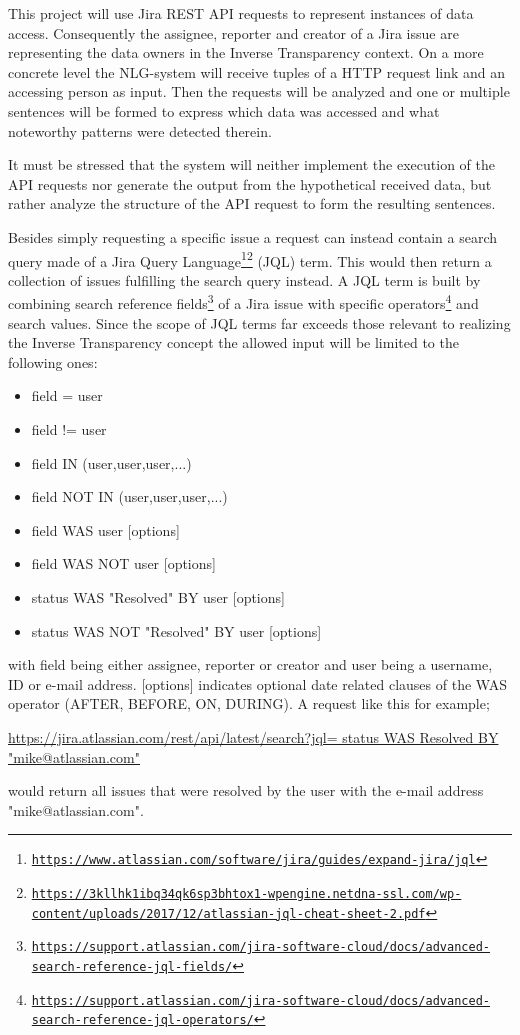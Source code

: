\documentclass[sigconf,obeyspaces]{acmart}
\begin{document}
This project will use Jira REST API requests to represent instances of data access. Consequently the assignee, reporter and creator of a Jira issue are representing the data owners in the Inverse Transparency context. On a more concrete level the NLG-system will receive tuples of a HTTP request link and an accessing person as input. Then the requests will be analyzed and one or multiple sentences will be formed to express which data was accessed and what noteworthy patterns were detected therein.

It must be stressed that the system will neither implement the execution of the API requests nor generate the output from the hypothetical received data, but rather analyze the structure of the API request to form the resulting sentences.

Besides simply requesting a specific issue a request can instead contain a search query made of a Jira Query Language\footnote{\texttt{\url{https://www.atlassian.com/software/jira/guides/expand-jira/jql}}}\footnote{\texttt{\url{https://3kllhk1ibq34qk6sp3bhtox1-wpengine.netdna-ssl.com/wp-content/uploads/2017/12/atlassian-jql-cheat-sheet-2.pdf}}} (JQL) term. This would then return a collection of issues fulfilling the search query instead. A JQL term is built by combining search reference fields\footnote{\texttt{\url{https://support.atlassian.com/jira-software-cloud/docs/advanced-search-reference-jql-fields/}}} of a Jira issue with specific operators\footnote{\texttt{\url{https://support.atlassian.com/jira-software-cloud/docs/advanced-search-reference-jql-operators/}}} and search values. Since the scope of JQL terms far exceeds those relevant to realizing the Inverse Transparency concept the allowed input will be limited to the following ones:
\begin{itemize}\obeyspaces
    \item field = user
    \item field != user
    \item field IN (user,user,user,...)
    \item field NOT IN (user,user,user,...)
    \item field WAS user                                        [options]
    \item field WAS NOT user                               [options]
    \item status WAS "Resolved" BY user              [options]
    \item status WAS NOT "Resolved" BY user     [options]
\end{itemize}
with field being either assignee, reporter or creator and user being a username, ID or e-mail address. [options] indicates optional date related clauses of the WAS operator (AFTER, BEFORE, ON, DURING). A request like this for example;
\begin{center}
    \url{https://jira.atlassian.com/rest/api/latest/search?jql= status WAS Resolved BY "mike@atlassian.com"}
\end{center}
would return all issues that were resolved by the user with the e-mail address "mike@atlassian.com".
\end{document}
